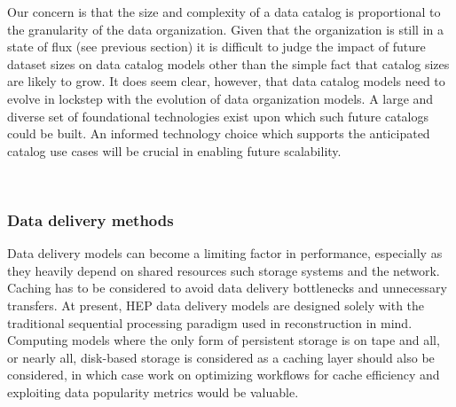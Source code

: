 \documentclass[12pt,a4paper]{article}
\begin{document}
Our concern is that the size and complexity of a data catalog is
proportional to the granularity of the data organization. Given that the
organization is still in a state of flux (see previous section) it is
difficult to judge the impact of future dataset sizes on data catalog
models other than the simple fact that catalog sizes are likely to grow.
It does seem clear, however, that data catalog models need to evolve in
lockstep with the evolution of data organization models. A large and
diverse set of foundational technologies exist upon which such future
catalogs could be built. An informed technology choice which supports
the anticipated catalog use cases will be crucial in enabling future
scalability.

~

\subsubsection{Data delivery methods}\label{data-delivery-methods}

Data delivery models can become a limiting factor in performance,
especially as they heavily depend on shared resources such storage
systems and the network. Caching has to be considered to avoid data
delivery bottlenecks and unnecessary transfers. At present, HEP data
delivery models are designed solely with the traditional sequential
processing paradigm used in reconstruction in mind. Computing models
where the only form of persistent storage is on tape and all, or nearly
all, disk-based storage is considered as a caching layer should also be
considered, in which case work on optimizing workflows for cache
efficiency and exploiting data popularity metrics would be valuable.

~
\end{document}
